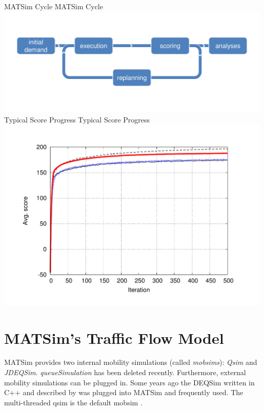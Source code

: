 \createfigure%
{MATSim Cycle}%
{MATSim Cycle}%
{\label{fig:matsimcycle}}%
{\includegraphics[width=0.99\textwidth, angle=0]{figures/matsimcycle.pdf}}%
{}
\createfigure%
{Typical Score Progress}%
{Typical Score Progress}%
{\label{fig:scoreprogress}}%
{\includegraphics[width=0.99\textwidth, angle=0]{using/figures/scores.pdf}}%
{}

\section{MATSim's Traffic Flow Model}
\label{sec:trafficflowmodel}
MATSim provides two internal mobility simulations (called \emph{mobsims}): \emph{Qsim} and \emph{JDEQSim}. \emph{queueSimulation} has been deleted recently. Furthermore, external mobility simulations can be plugged in. Some years ago the DEQSim written in C++ and described by \citet[][]{Charypar_PhDThesis_2008, CharyparEtAl_TRR_2007, CharyparEtAl_TRB_2009, CharyparEtAl_WCTRS_2007} was plugged into MATSim and frequently used. The multi-threaded qsim is the default mobsim \citep[][]{MATSim_Userguide_2014}. %

